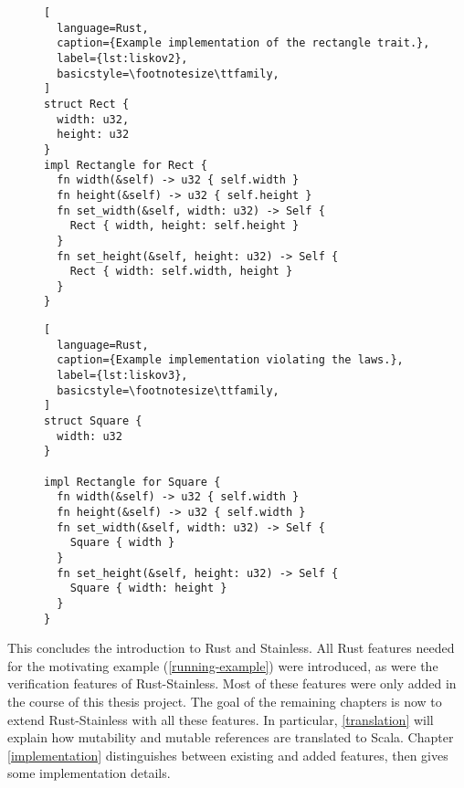 \begin{figure}[hbt]
\noindent \begin{minipage}[t]{.49\textwidth}
\begin{lstlisting}[
  language=Rust,
  caption={Example implementation of the rectangle trait.},
  label={lst:liskov2},
  basicstyle=\footnotesize\ttfamily,
]
struct Rect {
  width: u32,
  height: u32
}
impl Rectangle for Rect {
  fn width(&self) -> u32 { self.width }
  fn height(&self) -> u32 { self.height }
  fn set_width(&self, width: u32) -> Self {
    Rect { width, height: self.height }
  }
  fn set_height(&self, height: u32) -> Self {
    Rect { width: self.width, height }
  }
}
\end{lstlisting}
\end{minipage}\hfill
\begin{minipage}[t]{.49\textwidth}
\begin{lstlisting}[
  language=Rust,
  caption={Example implementation violating the laws.},
  label={lst:liskov3},
  basicstyle=\footnotesize\ttfamily,
]
struct Square {
  width: u32
}

impl Rectangle for Square {
  fn width(&self) -> u32 { self.width }
  fn height(&self) -> u32 { self.width }
  fn set_width(&self, width: u32) -> Self {
    Square { width }
  }
  fn set_height(&self, height: u32) -> Self {
    Square { width: height }
  }
}
\end{lstlisting}
\end{minipage}
\end{figure}

\hfill \break \noindent This concludes the introduction to Rust and Stainless.
All Rust features needed for the motivating example (\autoref{running-example})
were introduced, as were the verification features of Rust-Stainless.  Most of
these features were only added in the course of this thesis project. The goal of
the remaining chapters is now to extend Rust-Stainless with all these features.
In particular, \autoref{translation} will explain how mutability and mutable
references are translated to Scala. Chapter \ref{implementation} distinguishes
between existing and added features, then gives some implementation details.


